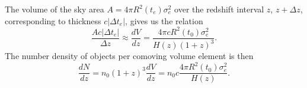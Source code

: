 \documentclass[]{article}
\begin{document}
The volume of the sky area $A = 4\pi R^2(t_e)\sigma_e^2$ over the redshift interval
$z$, $z+\Delta z$, corresponding to thickness $c |\Delta t_e|$, gives us the
relation
\begin{equation}
\frac{A c |\Delta t_e|}{\Delta z} \approx \frac{dV}{dz} = \frac{4\pi c R^2(t_0)\sigma_e^2}{H(z)(1+z)^3}.
\end{equation}
The number density of objects per comoving volume element is then
\begin{equation}
\frac{d N}{dz} = n_0(1+z)^3 \frac{dV}{dz} = n_0 c \frac{4 \pi R^2(t_0)\sigma_e^2}{H(z)}.
\end{equation}
\end{document}

